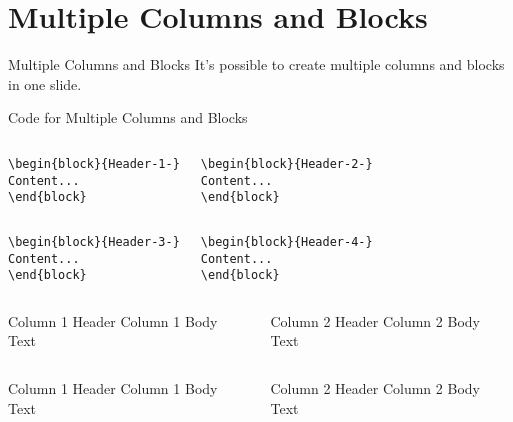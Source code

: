\documentclass[10pt,xcolor=x11names]{beamer}
\begin{document}
\section{Multiple Columns and Blocks}
\begin{frame}[fragile]{Multiple Columns and Blocks}
It's possible to create multiple columns and blocks in one slide. 
\begin{exampleblock}{Code for Multiple Columns and Blocks}
\begin{columns}
 \begin{verbatim}
\begin{block}{Header-1-}
Content...
\end{block}\end{verbatim}
\begin{verbatim}
\begin{block}{Header-2-}
Content...
\end{block}\end{verbatim}
\end{columns}
\begin{columns}
\begin{verbatim}
\begin{block}{Header-3-}
Content...
\end{block}\end{verbatim}
\begin{verbatim}
\begin{block}{Header-4-}
Content...
\end{block}\end{verbatim}
\end{columns}
\end{exampleblock}

\vspace{-15pt}

\begin{columns}[t]
\begin{block}{Column 1 Header}
Column 1 Body Text
\end{block}
\begin{block}{Column 2 Header}
Column 2 Body Text
\end{block}
\end{columns}\begin{columns}[t]
\begin{block}{Column 1 Header}
Column 1 Body Text
\end{block}
\begin{block}{Column 2 Header}
Column 2 Body Text
\end{block}
\end{columns}

\end{frame}
\end{document}
